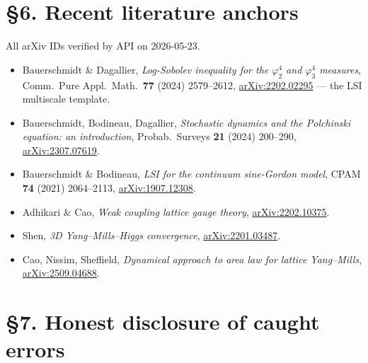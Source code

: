 \documentclass[11pt,a4paper]{article}
\begin{document}
\section*{§6. Recent literature anchors}

All arXiv IDs verified by API on 2026-05-23.
\begin{itemize}
  \item Bauerschmidt \& Dagallier, \emph{Log-Sobolev inequality for the $\varphi^4_2$ and $\varphi^4_3$ measures}, Comm.\ Pure Appl.\ Math.\ \textbf{77} (2024) 2579--2612, \href{https://arxiv.org/abs/2202.02295}{arXiv:2202.02295} --- the LSI multiscale template.
  \item Bauerschmidt, Bodineau, Dagallier, \emph{Stochastic dynamics and the Polchinski equation: an introduction}, Probab.\ Surveys \textbf{21} (2024) 200--290, \href{https://arxiv.org/abs/2307.07619}{arXiv:2307.07619}.
  \item Bauerschmidt \& Bodineau, \emph{LSI for the continuum sine-Gordon model}, CPAM \textbf{74} (2021) 2064--2113, \href{https://arxiv.org/abs/1907.12308}{arXiv:1907.12308}.
  \item Adhikari \& Cao, \emph{Weak coupling lattice gauge theory}, \href{https://arxiv.org/abs/2202.10375}{arXiv:2202.10375}.
  \item Shen, \emph{3D Yang--Mills--Higgs convergence}, \href{https://arxiv.org/abs/2201.03487}{arXiv:2201.03487}.
  \item Cao, Nissim, Sheffield, \emph{Dynamical approach to area law for lattice Yang--Mills}, \href{https://arxiv.org/abs/2509.04688}{arXiv:2509.04688}.
\end{itemize}

\section*{§7. Honest disclosure of caught errors}
\end{document}
